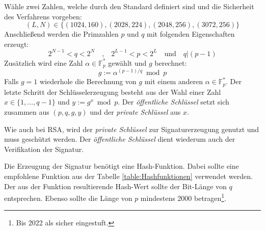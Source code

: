 \documentclass[11pt,a4paper,ngerman]{scrreprt}
\begin{document}
\begin{description}[font=\rmfamily]
    \item[Schlüsselerzeugung:] Wähle zwei Zahlen, welche durch den Standard definiert sind und die Sicherheit des Verfahrens vorgeben:
    \[
        (L, N) \in \{(1024, 160), (2028, 224), (2048, 256), (3072, 256)\}
    \]
    Anschließend werden die Primzahlen $p$ und $q$ mit folgenden Eigenschaften erzeugt:
    \[
        2^{N-1} < q < 2^N \quad\textrm{,}\quad 2^{L-1} < p < 2^L \quad\textrm{und}\quad q|(p-1)
    \]
    Zusätzlich wird eine Zahl $\alpha \in \mathbb{F}^*_p$ gewählt und $g$ berechnet:
    \[
        g := \alpha^{(p-1)/q} \bmod p
    \]
    Falls $g = 1$ wiederhole die Berechnung von $g$ mit einem anderen $\alpha \in \mathbb{F}^*_p$. Der letzte Schritt der Schlüsselerzeugung besteht aus der Wahl einer Zahl $x \in \{1, \ldots, q - 1 \}$ und $y := g^x \bmod p$. Der \emph{öffentliche Schlüssel} setzt sich zusammen aus $(p, q, g, y)$ und der \emph{private Schlüssel} aus $x$.
    
    Wie auch bei RSA, wird der \emph{private Schlüssel} zur Signaturerzeugung genutzt und muss geschützt werden. Der \emph{öffentliche Schlüssel} dient wiederum auch der Verifikation der Signatur.
    \item[Signaturerzeugung:] Die Erzeugung der Signatur benötigt eine Hash-Funktion. Dabei sollte eine empfohlene Funktion aus der Tabelle \ref{table:Hashfunktionen} verwendet werden. Der aus der Funktion resultierende Hash-Wert sollte der Bit-Länge von $q$ entsprechen. Ebenso sollte die Länge von $p$ mindestens 2000 betragen\footnote{Bis 2022 als sicher eingestuft.\cite{bsi-tr-02102-1}}.


\end{description}
\end{document}
